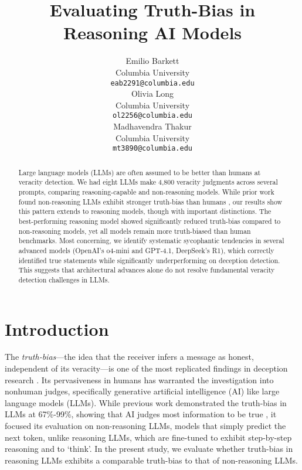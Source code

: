 \documentclass{article}
\title{Evaluating Truth-Bias in Reasoning AI Models}
\author{%
  Emilio Barkett\\
  Columbia University\\
  \texttt{eab2291@columbia.edu} \\
   \And
   Olivia Long \\
   Columbia University \\
   \texttt{ol2256@columbia.edu} \\
   \And
   Madhavendra Thakur \\
   Columbia University \\
   \texttt{mt3890@columbia.edu} \\
}
\begin{document}
\maketitle

\begin{abstract}
  Large language models (LLMs) are often assumed to be better than humans at veracity detection. We had eight LLMs make 4,800 veracity judgments across several prompts, comparing reasoning-capable and non-reasoning models. While prior work found non-reasoning LLMs exhibit stronger truth-bias than humans \citep{markowitz_generative_2024}, our results show this pattern extends to reasoning models, though with important distinctions. The best-performing reasoning model showed significantly reduced truth-bias compared to non-reasoning models, yet all models remain more truth-biased than human benchmarks. Most concerning, we identify systematic sycophantic tendencies in several advanced models (OpenAI's o4-mini and GPT-4.1, DeepSeek's R1), which correctly identified true statements while significantly underperforming on deception detection. This suggests that architectural advances alone do not resolve fundamental veracity detection challenges in LLMs.
\end{abstract}

\section{Introduction}

The \textit{truth-bias}---the idea that the receiver infers a message as honest, independent of its veracity---is one of the most replicated findings in deception research \citep{levine_duped_2020, levine_truth-default_2014}. Its pervasiveness in humans has warranted the investigation into nonhuman judges, specifically generative artificial intelligence (AI) like large language models (LLMs). While previous work demonstrated the truth-bias in LLMs at 67\%-99\%, showing that AI judges most information to be true \citep{markowitz_generative_2024}, it focused its evaluation on non-reasoning LLMs, models that simply predict the next token, unlike reasoning LLMs, which are fine-tuned to exhibit step-by-step reasoning and to `think'. In the present study, we evaluate whether truth-bias in reasoning LLMs exhibits a comparable truth-bias to that of non-reasoning LLMs.
\end{document}
